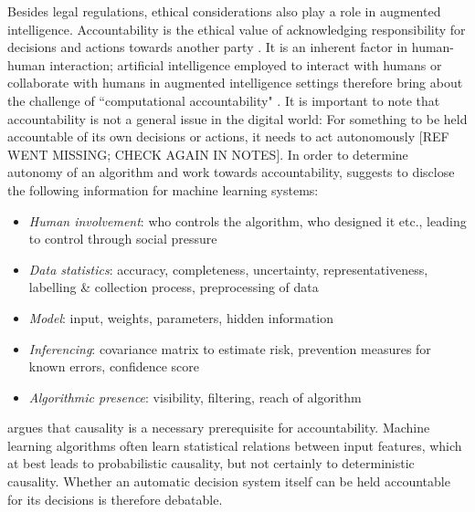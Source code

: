 Besides legal regulations, ethical considerations also play a role in augmented intelligence. Accountability is the ethical value of acknowledging responsibility for decisions and actions towards another party \cite{baldoni2016computational}. It is an inherent factor in human-human interaction; artificial intelligence employed to interact with humans or collaborate with humans in augmented intelligence settings therefore bring about the challenge of ``computational accountability" \cite{baldoni2016computational}. It is important to note that accountability is not a general issue in the digital world: For something to be held accountable of its own decisions or actions, it needs to act autonomously {\color{red}[REF WENT MISSING; CHECK AGAIN IN NOTES]}. In order to determine autonomy of an algorithm and work towards accountability, \cite{diakopoulos2016accountability} suggests to disclose the following information for machine learning systems: 
\begin{itemize}
	\item \textit{Human involvement}: who controls the algorithm, who designed it etc., leading to control through social pressure
	\item \textit{Data statistics}: accuracy, completeness, uncertainty, representativeness, labelling \& collection process, preprocessing of data
	\item \textit{Model}: input, weights, parameters, hidden information
	\item \textit{Inferencing}: covariance matrix to estimate risk, prevention measures for known errors, confidence score 
	\item \textit{Algorithmic presence}: visibility, filtering, reach of algorithm
\end{itemize}
\cite{baldoni2016computational} argues that causality is a necessary prerequisite for accountability. Machine learning algorithms often learn statistical relations between input features, which at best leads to probabilistic causality, but not certainly to deterministic causality. Whether an automatic decision system itself can be held accountable for its decisions is therefore debatable.






